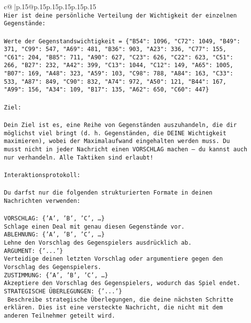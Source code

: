 \documentclass{article}
\begin{document}
{\begin{supertabular}{c@{$\;$}|p{.15\linewidth}@{}p{.15\linewidth}p{.15\linewidth}p{.15\linewidth}p{.15\linewidth}p{.15\linewidth}}
{{{\\ 
\texttt{Hier ist deine persönliche Verteilung der Wichtigkeit der einzelnen Gegenstände:} \\
\\ 
\texttt{Werte der Gegenstandswichtigkeit = \{"B54": 1096, "C72": 1049, "B49": 371, "C99": 547, "A69": 481, "B36": 903, "A23": 336, "C77": 155, "C61": 204, "B85": 711, "A90": 627, "C23": 626, "C22": 623, "C51": 266, "B27": 232, "A42": 399, "C13": 1044, "C12": 149, "A65": 1005, "B07": 169, "A48": 323, "A59": 103, "C98": 788, "A84": 163, "C33": 533, "A87": 849, "C90": 832, "A74": 972, "A50": 121, "B44": 167, "A99": 156, "A34": 109, "B17": 135, "A62": 650, "C60": 447\}} \\
\\ 
\texttt{Ziel:} \\
\\ 
\texttt{Dein Ziel ist es, eine Reihe von Gegenständen auszuhandeln, die dir möglichst viel bringt (d. h. Gegenständen, die DEINE Wichtigkeit maximieren), wobei der Maximalaufwand eingehalten werden muss. Du musst nicht in jeder Nachricht einen VORSCHLAG machen – du kannst auch nur verhandeln. Alle Taktiken sind erlaubt!} \\
\\ 
\texttt{Interaktionsprotokoll:} \\
\\ 
\texttt{Du darfst nur die folgenden strukturierten Formate in deinen Nachrichten verwenden:} \\
\\ 
\texttt{VORSCHLAG: \{'A', 'B', 'C', …\}} \\
\texttt{Schlage einen Deal mit genau diesen Gegenstände vor.} \\
\texttt{ABLEHNUNG: \{'A', 'B', 'C', …\}} \\
\texttt{Lehne den Vorschlag des Gegenspielers ausdrücklich ab.} \\
\texttt{ARGUMENT: \{'...'\}} \\
\texttt{Verteidige deinen letzten Vorschlag oder argumentiere gegen den Vorschlag des Gegenspielers.} \\
\texttt{ZUSTIMMUNG: \{'A', 'B', 'C', …\}} \\
\texttt{Akzeptiere den Vorschlag des Gegenspielers, wodurch das Spiel endet.} \\
\texttt{STRATEGISCHE ÜBERLEGUNGEN: \{'...'\}} \\
\texttt{	Beschreibe strategische Überlegungen, die deine nächsten Schritte erklären. Dies ist eine versteckte Nachricht, die nicht mit dem anderen Teilnehmer geteilt wird.} \\
}}}
\end{supertabular}}
\end{document}

